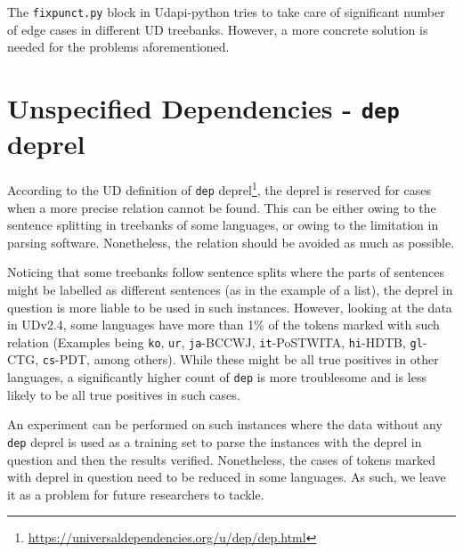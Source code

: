 The \verb|fixpunct.py| block in Udapi-python \citep{udapi} tries to take care of significant number of edge cases in different UD treebanks. However, a more concrete solution is needed for the problems aforementioned.

\section{Unspecified Dependencies - \texttt{dep} deprel}

According to the UD definition of \verb|dep| deprel\footnote{\url{https://universaldependencies.org/u/dep/dep.html}}, the deprel is reserved for cases when a more precise relation cannot be found. This can be either owing to the sentence splitting in treebanks of some languages, or owing to the limitation in parsing software. Nonetheless, the relation should be avoided as much as possible.

Noticing that some treebanks follow sentence splits where the parts of sentences might be labelled as different sentences (as in the example of a list), the deprel in question is more liable to be used in such instances. However, looking at the data in UDv2.4, some languages have more than 1\% of the tokens marked with such relation (Examples being \verb|ko|, \verb|ur|, \verb|ja|-BCCWJ, \verb|it|-PoSTWITA, \verb|hi|-HDTB, \verb|gl|-CTG, \verb|cs|-PDT, among others). While these might be all true positives in other languages, a significantly higher count of \verb|dep| is more troublesome and is less likely to be all true positives in such cases.

An experiment can be performed on such instances where the data without any \verb|dep| deprel is used as a training set to parse the instances with the deprel in question and then the results verified. Nonetheless, the cases of tokens marked with deprel in question need to be reduced in some languages. As such, we leave it as a problem for future researchers to tackle.